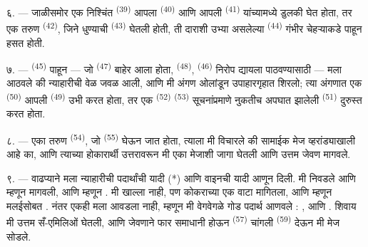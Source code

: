 \VUsaut{4.0mm}
\VUsaut{3.0mm}

६. --- जाळीसमोर एक निश्चिंत  \textsuperscript{(39)} आपला
 \textsuperscript{(40)} आणि आपली 
\textsuperscript{(41)} यांच्यामध्ये डुलकी घेत होता, तर एक तरुण 
\textsuperscript{(42)}, जिने धुण्याची  \textsuperscript{(43)} घेतली होती, ती
दाराशी उभ्या असलेल्या  \textsuperscript{(44)} गंभीर
चेहऱ्याकडे पाहून हसत होती.

७. ---  \textsuperscript{(45)} पाहून — जो 
\textsuperscript{(47)} बाहेर आला होता, 
\textsuperscript{(48)},  \textsuperscript{(46)} निरोप द्यायला
पाठवण्यासाठी — मला आठवले की न्याहारीची वेळ जवळ आली, आणि मी अंगण ओलांडून उपाहारगृहात शिरलो;
त्या अंगणात एक  \textsuperscript{(50)} आपली 
\textsuperscript{(49)} उभी करत होता, तर एक  \textsuperscript{(52)}
 \textsuperscript{(53)} सूचनांप्रमाणे नुकतीच अपघात झालेली
 \textsuperscript{(51)} दुरुस्त करत होता.

८. --- एका तरुण  \textsuperscript{(54)}, जो 
\textsuperscript{(55)} घेऊन जात होता, त्याला मी विचारले की सामाईक मेज व्हरांड्याखाली आहे का,
आणि त्याच्या होकारार्थी उत्तरावरून मी एका मेजाशी जागा घेतली आणि उत्तम जेवण मागवले.


\VUsaut{4.0mm}
\VUsaut{3.0mm}

९. --- वाढप्याने मला न्याहारीची पदार्थांची यादी (*) आणि वाइनची यादी आणून दिली. मी निवडले आणि
 म्हणून   मागवली, आणि
 म्हणून . मी  खाल्ला नाही, पण
कोकराच्या  एक वाटा मागितला, आणि  म्हणून मलईसोबत
. नंतर  एकही मला आवडला नाही, म्हणून मी वेगवेगळे गोड
पदार्थ आणवले : ,  आणि . शिवाय मी उत्तम सँ-एमिलिओं
 घेतली, आणि जेवणाने फार समाधानी होऊन  \textsuperscript{(57)}
चांगली  \textsuperscript{(59)} देऊन मी मेज सोडले.

